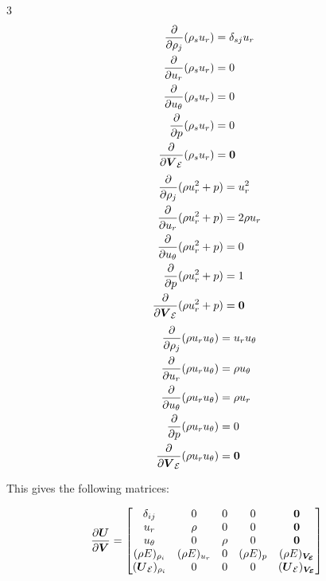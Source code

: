\documentclass[10pt]{article}
\begin{document}
\begin{flushleft}
\begin{multicols}{3}    
    \begin{align*}
        \frac{\partial }{\partial \rho_j} (\rho_s u_r) &= \delta_{sj} u_r \\
        \frac{\partial }{\partial u_r} (\rho_s u_r) &= 0 \\
        \frac{\partial }{\partial u_\theta} (\rho_s u_r) &= 0 \\
        \frac{\partial }{\partial p} (\rho_s u_r) &= 0 \\
        \frac{\partial }{\partial \boldsymbol{V}_{\mathcal{E}}} (\rho_s u_r) &= \boldsymbol{0} \\
    \end{align*}
    \hspace{5mm}
        \begin{align*}
        \frac{\partial }{\partial \rho_j}(\rho u_r^2 + p) &= u_r^2 \\
        \frac{\partial }{\partial u_r} (\rho u_r^2 + p) &= 2 \rho u_r \\
        \frac{\partial }{\partial u_\theta} (\rho u_r^2 + p) &= 0 \\
        \frac{\partial }{\partial p} (\rho u_r^2 + p) &= 1 \\
        \frac{\partial }{\partial \boldsymbol{V}_{\mathcal{E}}} (\rho u_r^2 + p) &= \boldsymbol{0} \\
    \end{align*}
    \hspace{5mm}
        \begin{align*}
        \frac{\partial }{\partial \rho_j}(\rho u_r u_\theta) &= u_r u_\theta \\
        \frac{\partial }{\partial u_r} (\rho u_r u_\theta) &= \rho u_\theta \\
        \frac{\partial }{\partial u_\theta} (\rho u_r u_\theta) &= \rho u_r \\
        \frac{\partial }{\partial p} (\rho u_r u_\theta) &= 0 \\
        \frac{\partial }{\partial \boldsymbol{V}_{\mathcal{E}}} (\rho u_r u_\theta) &= \boldsymbol{0} \\
    \end{align*}
\end{multicols}

This gives the following matrices:

\begin{equation*}
    \frac{\partial \boldsymbol{U}}{\partial \boldsymbol{V}} = 
    \begin{bmatrix}
        \delta_{ij} & 0 & 0 & 0 & \boldsymbol{0} \\
        u_r & \rho & 0 & 0 & \boldsymbol{0} \\
        u_\theta & 0 & \rho & 0 & \boldsymbol{0} \\
        (\rho E)_{\rho_i} & (\rho E)_{u_r} & 0 & (\rho E)_{p} & (\rho E)_{\boldsymbol{V_{\mathcal{E}}}} \\
        (\boldsymbol{U}_{\mathcal{E}})_{\rho_i} & 0 & 0 & 0 & (\boldsymbol{U}_{\mathcal{E}})_{\boldsymbol{V_{\mathcal{E}}}}
    \end{bmatrix}
\end{equation*}


\end{flushleft}
\end{document}
